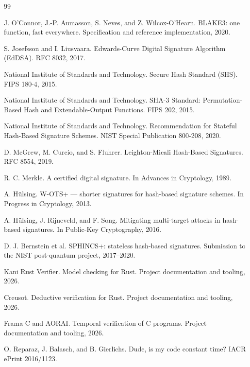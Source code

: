 \documentclass[11pt,a4paper]{article}
\theoremstyle{remark}
\begin{document}
\begin{thebibliography}{99}

J. O'Connor, J.-P. Aumasson, S. Neves, and Z. Wilcox-O'Hearn.
\newblock BLAKE3: one function, fast everywhere.
\newblock Specification and reference implementation, 2020.

S. Josefsson and I. Liusvaara.
\newblock Edwards-Curve Digital Signature Algorithm (EdDSA).
\newblock RFC 8032, 2017.

National Institute of Standards and Technology.
\newblock Secure Hash Standard (SHS).
\newblock FIPS 180-4, 2015.

National Institute of Standards and Technology.
\newblock SHA-3 Standard: Permutation-Based Hash and Extendable-Output Functions.
\newblock FIPS 202, 2015.

National Institute of Standards and Technology.
\newblock Recommendation for Stateful Hash-Based Signature Schemes.
\newblock NIST Special Publication 800-208, 2020.

D. McGrew, M. Curcio, and S. Fluhrer.
\newblock Leighton-Micali Hash-Based Signatures.
\newblock RFC 8554, 2019.

R. C. Merkle.
\newblock A certified digital signature.
\newblock In Advances in Cryptology, 1989.

A. Hülsing.
\newblock W-OTS+ --- shorter signatures for hash-based signature schemes.
\newblock In Progress in Cryptology, 2013.

A. Hülsing, J. Rijneveld, and F. Song.
\newblock Mitigating multi-target attacks in hash-based signatures.
\newblock In Public-Key Cryptography, 2016.

D. J. Bernstein et al.
\newblock SPHINCS+: stateless hash-based signatures.
\newblock Submission to the NIST post-quantum project, 2017--2020.

Kani Rust Verifier.
\newblock Model checking for Rust.
\newblock Project documentation and tooling, 2026.

Creusot.
\newblock Deductive verification for Rust.
\newblock Project documentation and tooling, 2026.

Frama-C and AORAI.
\newblock Temporal verification of C programs.
\newblock Project documentation and tooling, 2026.

O. Reparaz, J. Balasch, and B. Gierlichs.
\newblock Dude, is my code constant time?
\newblock IACR ePrint 2016/1123.


\end{thebibliography}
\end{document}
